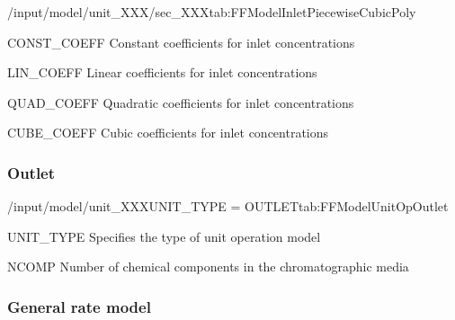 \begin{groupscope}{/input/model/unit\_XXX/sec\_XXX}{tab:FFModelInletPiecewiseCubicPoly}
  \begin{dataset}[type=double,unit=\si{\mol\per\cubic\metre\of{IV}},range={$\mathds{R}$},length={\texttt{NCOMP}}]{CONST\_COEFF}
    Constant coefficients for inlet concentrations
  \end{dataset}
  \begin{dataset}[type=double,unit=\si{\mol\per\cubic\metre\of{IV}\per\second},range={$\mathds{R}$},length={\texttt{NCOMP}}]{LIN\_COEFF}
    Linear coefficients for inlet concentrations
  \end{dataset}
  \begin{dataset}[type=double,unit=\si{\mol\per\cubic\metre\of{IV}\per\square\second},range={$\mathds{R}$},length={\texttt{NCOMP}}]{QUAD\_COEFF}
    Quadratic coefficients for inlet concentrations
  \end{dataset}
  \begin{dataset}[type=double,unit=\si{\mol\per\cubic\metre\of{IV}\per\cubic\second},range={$\mathds{R}$},length={\texttt{NCOMP}}]{CUBE\_COEFF}
    Cubic coefficients for inlet concentrations
  \end{dataset}
\end{groupscope}

\subsubsection{Outlet}

\begin{condsubgroup}{/input/model/unit\_XXX}{UNIT\_TYPE = OUTLET}{tab:FFModelUnitOpOutlet}
  \begin{dataset}[type=string,range={\texttt{OUTLET}},length=1]{UNIT\_TYPE}
    Specifies the type of unit operation model
  \end{dataset}
  \begin{dataset}[type=int,range={$\geq 1$},length=1]{NCOMP}
    Number of chemical components in the chromatographic media
  \end{dataset}
\end{condsubgroup}

\subsubsection{General rate model}

